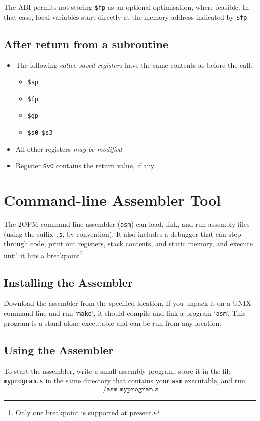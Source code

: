 \documentclass{article}
\begin{document}
    The ABI permits not storing \texttt{\$fp} as an optional
    optimisation, where feasible.
    In that case, local variables start directly
    at the memory address indicated by \texttt{\$fp}.

\subsection{After return from a subroutine}
  \begin{itemize}
    \item The following \emph{callee-saved registers} have the same contents as before the call:
      \begin{itemize}
        \item \texttt{\$sp}
        \item \texttt{\$fp}
        \item \texttt{\$gp}
        \item \texttt{\$s0}--\texttt{\$s3}
      \end{itemize}
    \item All other registers \emph{may be modified}
    \item Register \texttt{\$v0} contains the return value, if any
  \end{itemize}

\section{Command-line Assembler Tool}

The 2OPM command line assembler (\texttt{asm}) can load, link, and run assembly files
(using the suffix \texttt{.s}, by convention).  It also includes a debugger that can step
through code, print out registers, stack contents, and static memory, and execute until it hits a breakpoint\footnote{
Only one breakpoint is supported at present.}

\subsection{Installing the Assembler}
Download the assembler from the specified location.  If you unpack it
on a UNIX command line and run `\texttt{make}', it should compile
and link a program `\texttt{asm}'.  This program is a stand-alone executable
and can be run from any location.

\subsection{Using the Assembler}
To start the assembler, write a small assembly program, store it in the file \texttt{myprogram.s} in the same
directory that contains your \texttt{asm} executable, and run
\[
\texttt{./asm myprogram.s}
\]
\end{document}
